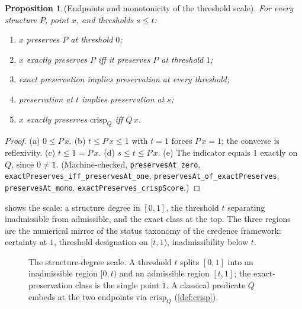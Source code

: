 \documentclass[11pt,a4paper]{article}
\newtheorem{proposition}[theorem]{Proposition}
\begin{document}
\begin{proposition}[Endpoints and monotonicity of the threshold scale]
\label{thm:endpoints}
For every structure $P$, point $x$, and thresholds $s \le t$:
\begin{enumerate}[label=\textup{(\alph*)},nosep]
\item $x$ preserves $P$ at threshold $0$;
\item $x$ exactly preserves $P$ iff it preserves $P$ at threshold $1$;
\item exact preservation implies preservation at every threshold;
\item preservation at $t$ implies preservation at $s$;
\item $x$ exactly preserves $\mathrm{crisp}_Q$ iff $Q\,x$.
\end{enumerate}
\end{proposition}
\begin{proof}
(a) $0 \le P\,x$.
(b) $t \le P\,x \le 1$ with $t = 1$ forces $P\,x = 1$; the converse is
reflexivity.
(c) $t \le 1 = P\,x$.
(d) $s \le t \le P\,x$.
(e) The indicator equals $1$ exactly on $Q$, since $0 \neq 1$.
(Machine-checked, \texttt{preservesAt\_zero},
\texttt{exactPreserves\_iff\_preservesAt\_one},
\texttt{preservesAt\_of\_exactPreserves},
\texttt{preservesAt\_mono},
\texttt{exactPreserves\_crispScore}.)
\end{proof}

 shows the scale: a structure degree in $[0,1]$, the
threshold $t$ separating inadmissible from admissible, and the exact
class at the top.
The three regions are the numerical mirror of the status taxonomy of
the credence framework: certainty at $1$, threshold designation on
$[t,1)$, inadmissibility below $t$.

\begin{figure}[ht]
\centering
{}
\caption{The structure-degree scale.
A threshold $t$ splits $[0,1]$ into an inadmissible region
$[0,t)$ and an admissible region $[t,1]$; the exact-preservation class
is the single point $1$.
A classical predicate $Q$ embeds at the two endpoints via
$\mathrm{crisp}_Q$ (\cref{def:crisp}).}
\label{fig:scale}
\end{figure}
\end{document}
